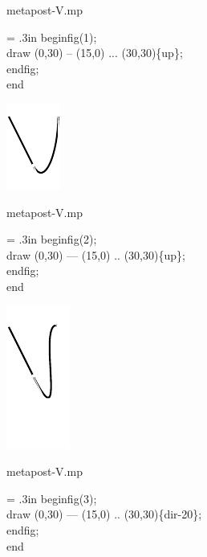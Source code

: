 \documentclass[danish,a2paper,22pt]{scrartcl}
\begin{document}
\begin{multicols*}{3}
\begin{spacing}{0.5}
\flushleft
\color{White}
\romansmall
metapost-V.mp\\
\vspace{.4cm}
\color{Black}
\typewritersmall
{\leftskip = .3in
beginfig(1);\\
draw (0,30) -- (15,0) ... (30,30)\fontsize{15pt}{40pt}\{up\};\\
endfig;\\
end
\par}
\vspace{2.1cm}

\center
\includegraphics[scale=5]{metapoints/metapoints-10.pdf}
\vspace{2.5cm}

\flushleft
\color{White}
\romansmall
metapost-V.mp\\
\vspace{.4cm}
\color{Black}
\typewritersmall
{\leftskip = .3in
beginfig(2);\\
draw (0,30) --- (15,0) .. (30,30)\fontsize{15pt}{40pt}\{up\};\\
endfig;\\
end
\par}
\vspace{2cm}

\center
\includegraphics[scale=5]{metapoints/metapoints-11.pdf}
\vspace{0cm}

\flushleft
\color{White}
\romansmall
metapost-V.mp\\
\vspace{.4cm}
\color{Black}
\typewritersmall
{\leftskip = .3in
beginfig(3);\\
draw (0,30) --- (15,0) .. (30,30)\fontsize{15pt}{40pt}\{dir-20\};\\
endfig;\\
end
\par}
\vspace{1.5cm}

\end{spacing}

\end{multicols*}
\end{document}
